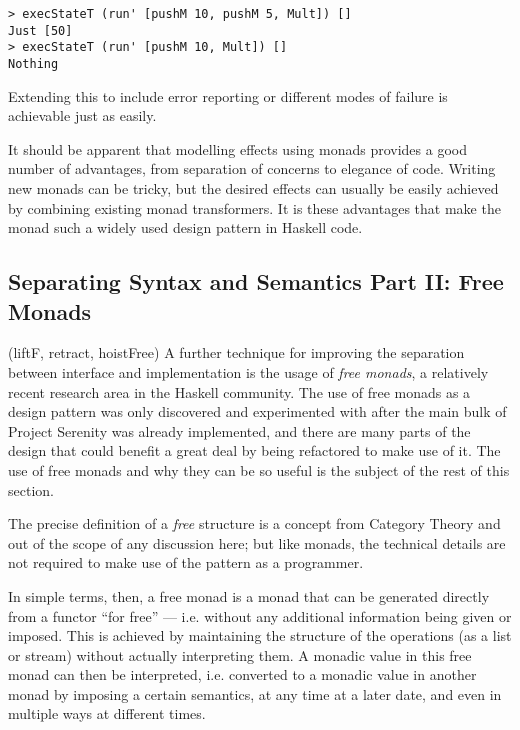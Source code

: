 \begin{verbatim}
> execStateT (run' [pushM 10, pushM 5, Mult]) []
Just [50]
> execStateT (run' [pushM 10, Mult]) []
Nothing
\end{verbatim}

\noindent Extending this to include error reporting or different modes of failure is achievable just as easily.

It should be apparent that modelling effects using monads provides a good number of advantages, from separation of concerns to elegance of code. Writing new monads can be tricky, but the desired effects can usually be easily achieved by combining existing monad transformers. It is these advantages that make the monad such a widely used design pattern in Haskell code.

\subsection{Separating Syntax and Semantics Part II: Free Monads}

\functions(liftF, retract, hoistFree)
A further technique for improving the separation between interface and implementation is the usage of \emph{free monads}, a relatively recent research area in the Haskell community. 
The use of free monads as a design pattern was only discovered and experimented with after the main bulk of Project Serenity was already implemented, and there are many parts of the design that could benefit a great deal by being refactored to make use of it. The use of free monads and why they can be so useful is the subject of the rest of this section.

The precise definition of a \emph{free} structure is a concept from Category Theory and out of the scope of any discussion here; but like monads, the technical details are not required to make use of the pattern as a programmer.

In simple terms, then, a free monad is a monad that can be generated directly from a functor ``for free'' --- i.e. without any additional information being given or imposed. This is achieved by maintaining the structure of the operations (as a list or stream) without actually interpreting them. A monadic value in this free monad can then be interpreted, i.e. converted to a monadic value in another monad by imposing a certain semantics, at any time at a later date, and even in multiple ways at different times.

